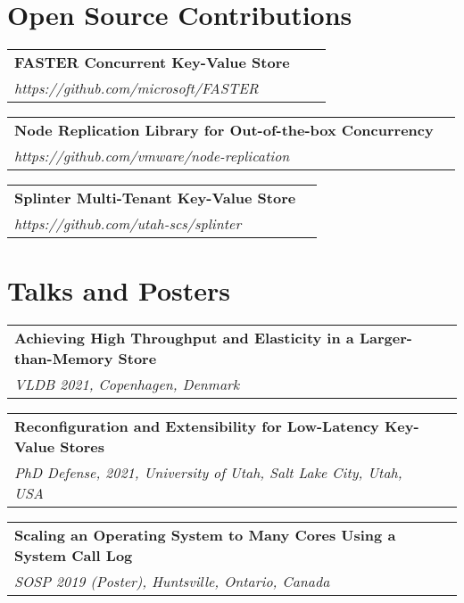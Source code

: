 \documentclass[margin,line]{res}
\begin{document}
\begin{resume}
\section{\sc Open Source Contributions}
\begin{tabular}{@{}p{5.5in}p{2in}p{2in}}
{\bf FASTER Concurrent Key-Value Store}\\
{\small\em https://github.com/microsoft/FASTER}
\end{tabular}

\vspace{-2.5pt}
\begin{tabular}{@{}p{5.5in}p{4in}}
{\bf Node Replication Library for Out-of-the-box Concurrency}\\
{\small\em https://github.com/vmware/node-replication}
\end{tabular}

\vspace{-2.5pt}
\begin{tabular}{@{}p{5.5in}p{4in}}
{\bf Splinter Multi-Tenant Key-Value Store}\\
{\small\em https://github.com/utah-scs/splinter}
\end{tabular}

\section{\sc Talks and Posters}
\begin{tabular}{@{}p{5.5in}p{4in}}
{\bf Achieving High Throughput and Elasticity in a Larger-than-Memory Store}\\
{\small\em VLDB 2021, Copenhagen, Denmark}\\
\end{tabular}

\vspace{-7pt}
\begin{tabular}{@{}p{5.5in}p{4in}}
{\bf Reconfiguration and Extensibility for Low-Latency Key-Value Stores}\\
{\small\em PhD Defense, 2021, University of Utah, Salt Lake City, Utah, USA}\\
\end{tabular}

\vspace{-7pt}
\begin{tabular}{@{}p{5.5in}p{4in}}
{\bf Scaling an Operating System to Many Cores Using a System Call Log}\\
{\small\em SOSP 2019 (Poster), Huntsville, Ontario, Canada}\\
\end{tabular}


\end{resume}
\end{document}
